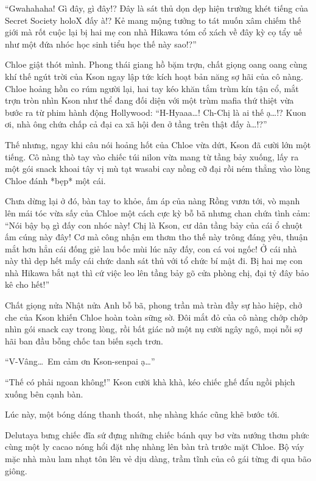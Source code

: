\documentclass[../main.tex]{subfiles}
\begin{document}
``Gwahahaha! Gì đây, gì đây!? Đây là sát thủ dọn dẹp hiện trường khét tiếng của Secret Society holoX đấy à!? Kẻ mang mộng tưởng to tát muốn xâm chiếm thế giới mà rốt cuộc lại bị hai mẹ con nhà Hikawa tóm cổ xách về đây kỳ cọ tẩy uế như một đứa nhóc học sinh tiểu học thế này sao!?''

Chloe giật thót mình. Phong thái giang hồ bặm trợn, chất giọng oang oang cùng khí thế ngút trời của Kson ngay lập tức kích hoạt bản năng sợ hãi của cô nàng. Chloe hoảng hồn co rúm người lại, hai tay kéo khăn tắm trùm kín tận cổ, mắt trợn tròn nhìn Kson như thể đang đối diện với một trùm mafia thứ thiệt vừa bước ra từ phim hành động Hollywood: ``H-Hyaaa\dots! Ch-Chị là ai thế ạ\dots!? Kuon ơi, nhà ông chứa chấp cả đại ca xã hội đen ở tầng trên thật đấy à\dots!?''

Thế nhưng, ngay khi câu nói hoảng hốt của Chloe vừa dứt, Kson đã cười lớn một tiếng. Cô nàng thò tay vào chiếc túi nilon vừa mang từ tầng bảy xuống, lấy ra một gói snack khoai tây vị mù tạt wasabi cay nồng cỡ đại rồi ném thẳng vào lòng Chloe đánh *bẹp* một cái.

Chưa dừng lại ở đó, bàn tay to khỏe, ấm áp của nàng Rồng vươn tới, vò mạnh lên mái tóc vừa sấy của Chloe một cách cực kỳ bỗ bã nhưng chan chứa tình cảm: ``Nói bậy bạ gì đấy con nhóc này! Chị là Kson, cư dân tầng bảy của cái ổ chuột ấm cúng này đây! Cơ mà công nhận em thơm tho thế này trông đáng yêu, thuận mắt hơn hẳn cái đống giẻ lau bốc mùi lúc nãy đấy, con cá voi ngốc! Ở cái nhà này thì dẹp hết mấy cái chức danh sát thủ với tổ chức bí mật đi. Bị hai mẹ con nhà Hikawa bắt nạt thì cứ việc leo lên tầng bảy gõ cửa phòng chị, đại tỷ đây bảo kê cho hết!''

Chất giọng nửa Nhật nửa Anh bỗ bã, phong trần mà tràn đầy sự hào hiệp, chở che của Kson khiến Chloe hoàn toàn sững sờ. Đôi mắt đỏ của cô nàng chớp chớp nhìn gói snack cay trong lòng, rồi bất giác nở một nụ cười ngây ngô, mọi nỗi sợ hãi ban đầu bỗng chốc tan biến sạch trơn.

``V-Vâng\dots\ Em cảm ơn Kson-senpai ạ\dots''

``Thế có phải ngoan không!'' Kson cười khà khà, kéo chiếc ghế đẩu ngồi phịch xuống bên cạnh bàn.

Lúc này, một bóng dáng thanh thoát, nhẹ nhàng khác cũng khẽ bước tới.

Delutaya bưng chiếc đĩa sứ đựng những chiếc bánh quy bơ vừa nướng thơm phức cùng một ly cacao nóng hổi đặt nhẹ nhàng lên bàn trà trước mặt Chloe. Bộ váy mặc nhà màu lam nhạt tôn lên vẻ dịu dàng, trầm tĩnh của cô gái từng đi qua bão giông.
\end{document}
